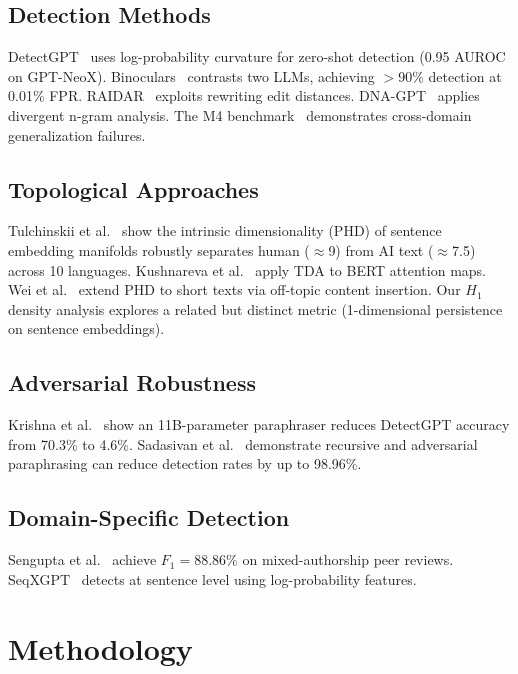 \documentclass[conference]{IEEEtran}
\begin{document}
\subsection{Detection Methods}

DetectGPT~\cite{mitchell2023detectgpt} uses log-probability curvature for zero-shot detection (0.95 AUROC on GPT-NeoX). Binoculars~\cite{hans2024binoculars} contrasts two LLMs, achieving $>$90\% detection at 0.01\% FPR. RAIDAR~\cite{mao2024raidar} exploits rewriting edit distances. DNA-GPT~\cite{yang2023dnagpt} applies divergent n-gram analysis. The M4 benchmark~\cite{wang2024m4} demonstrates cross-domain generalization failures.

\subsection{Topological Approaches}

Tulchinskii et al.~\cite{tulchinskii2024intrinsic} show the intrinsic dimensionality (PHD) of sentence embedding manifolds robustly separates human ($\approx$9) from AI text ($\approx$7.5) across 10 languages. Kushnareva et al.~\cite{kushnareva2023artificial} apply TDA to BERT attention maps. Wei et al.~\cite{wei2025shortphd} extend PHD to short texts via off-topic content insertion. Our $H_1$ density analysis explores a related but distinct metric (1-dimensional persistence on sentence embeddings).

\subsection{Adversarial Robustness}

Krishna et al.~\cite{krishna2024paraphrasing} show an 11B-parameter paraphraser reduces DetectGPT accuracy from 70.3\% to 4.6\%. Sadasivan et al.~\cite{sadasivan2023reliable,sadasivan2025adversarial} demonstrate recursive and adversarial paraphrasing can reduce detection rates by up to 98.96\%.

\subsection{Domain-Specific Detection}

Sengupta et al.~\cite{sengupta2025mixrevdetect} achieve $F_1 = 88.86\%$ on mixed-authorship peer reviews. SeqXGPT~\cite{wang2023seqxgpt} detects at sentence level using log-probability features.

\section{Methodology}
\end{document}
